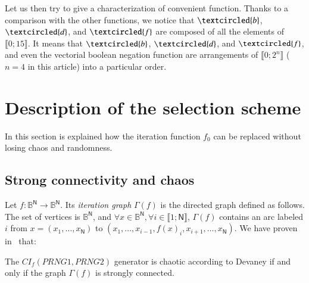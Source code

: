 Let us then try to give a characterization of convenient function. 
Thanks to a comparison with the other functions, we notice that 
$\textcircled{b}$,  $\textcircled{d}$, and $\textcircled{f}$ are composed of all the elements of
$\llbracket 0;15  \rrbracket$.
It means that $\textcircled{b}$,  $\textcircled{d}$, and $\textcircled{f}$, and even the vectorial  boolean
negation function are arrangements  of 
$\llbracket  0;2^n \rrbracket$  ($n=4$ in  this article)  into a
particular order.

\section{Description of the selection scheme}
\label{section:description}

In this section is explained how the iteration function $f_0$ can be replaced without losing chaos and randomness.

\subsection{Strong connectivity and chaos}


Let $f:\mathds{B}^\mathsf{N} \rightarrow \mathds{B}^\mathsf{N}$. Its
{\emph{iteration graph}} $\Gamma(f)$ is the directed graph defined as follows. 
The set of vertices is
$\mathds{B}^\mathsf{N}$, and $\forall x\in\mathds{B}^\mathsf{N}, \forall i\in \llbracket1;\mathsf{N}\rrbracket$,
$\Gamma(f)$ contains an arc labeled $i$ from $x = (x_1, \hdots, x_\mathsf{N})$ to $(x_1, \hdots, x_{i-1}, f(x)_i, x_{i+1}, \hdots, x_\mathsf{N})$. 
We have proven in~\cite{GuyeuxThese10} that:


\begin{theorem}
\label{IC_chaotiques}
The $CI_f(PRNG1,PRNG2)$ generator is chaotic according to Devaney if and only if the graph $\Gamma(f)$ is strongly connected.
\end{theorem}

